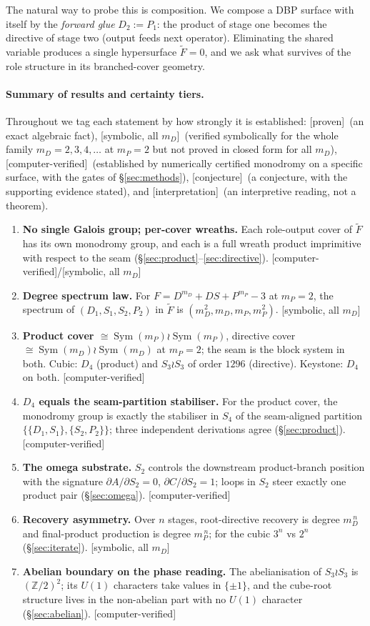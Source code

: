\documentclass[11pt]{article}
\theoremstyle{plain}
\theoremstyle{definition}
\theoremstyle{remark}
\newcommand{\Proven}{\textsf{[proven]}}
\newcommand{\Symbolic}{\textsf{[symbolic, all $m_D$]}}
\newcommand{\Measured}{\textsf{[computer-verified]}}
\newcommand{\Conj}{\textsf{[conjecture]}}
\newcommand{\Interp}{\textsf{[interpretation]}}
\newcommand{\Sym}{\operatorname{Sym}}
\newcommand{\Ftil}{\widetilde{F}}
\newcommand{\Z}{\mathbb{Z}}
\begin{document}
The natural way to probe this is composition. We compose a DBP surface with itself
by the \emph{forward glue} $D_2 := P_1$: the product of stage one becomes the
directive of stage two (output feeds next operator). Eliminating the shared
variable produces a single hypersurface $\Ftil=0$, and we ask what survives of the
role structure in its branched-cover geometry.

\paragraph{Summary of results and certainty tiers.}
Throughout we tag each statement by how strongly it is established: \Proven\ (an
exact algebraic fact), \Symbolic\ (verified symbolically for the whole family
$m_D=2,3,4,\dots$ at $m_P=2$ but not proved in closed form for all $m_D$),
\Measured\ (established by numerically certified monodromy on a specific surface,
with the gates of \S\ref{sec:methods}), \Conj\ (a conjecture, with the supporting
evidence stated), and \Interp\ (an interpretive reading, not a theorem).

\begin{enumerate}[leftmargin=1.4em]
\item \textbf{No single Galois group; per-cover wreaths.} Each role-output cover of
$\Ftil$ has its own monodromy group, and each is a full wreath product imprimitive
with respect to the seam (\S\ref{sec:product}--\ref{sec:directive}). \Measured/\Symbolic
\item \textbf{Degree spectrum law.} For $F=D^{m_D}+DS+P^{m_P}-3$ at $m_P=2$, the
spectrum of $(D_1,S_1,S_2,P_2)$ in $\Ftil$ is $(m_D^2,m_D,m_P,m_P^2)$. \Symbolic
\item \textbf{Product cover $\cong \Sym(m_P)\wr\Sym(m_P)$}, directive cover
$\cong\Sym(m_D)\wr\Sym(m_D)$ at $m_P=2$; the seam is the block system in both.
Cubic: $D_4$ (product) and $S_3\wr S_3$ of order $1296$ (directive). Keystone:
$D_4$ on both. \Measured
\item \textbf{$D_4$ equals the seam-partition stabiliser.} For the product cover,
the monodromy group is exactly the stabiliser in $S_4$ of the seam-aligned
partition $\{\{D_1,S_1\},\{S_2,P_2\}\}$; three independent derivations agree
(\S\ref{sec:product}). \Measured
\item \textbf{The omega substrate.} $S_2$ controls the downstream product-branch
position with the signature $\partial A/\partial S_2=0$, $\partial C/\partial
S_2=1$; loops in $S_2$ steer exactly one product pair (\S\ref{sec:omega}). \Measured
\item \textbf{Recovery asymmetry.} Over $n$ stages, root-directive recovery is
degree $m_D^{\,n}$ and final-product production is degree $m_P^{\,n}$; for the cubic
$3^n$ vs $2^n$ (\S\ref{sec:iterate}). \Symbolic
\item \textbf{Abelian boundary on the phase reading.} The abelianisation of
$S_3\wr S_3$ is $(\Z/2)^2$; its $U(1)$ characters take values in $\{\pm1\}$, and the
cube-root structure lives in the non-abelian part with no $U(1)$ character
(\S\ref{sec:abelian}). \Measured
\end{enumerate}
\end{document}
